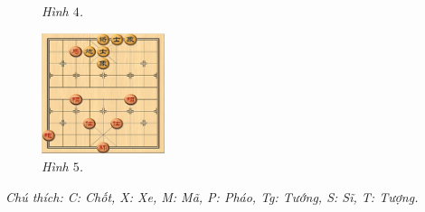 \begin{multicols}{2}
\begin{figure}[H]
					\caption{\small\textit{\color{gocco}Hình $4$.}}
					\vspace*{-10pt}
				\end{figure}
		\begin{figure}[H]
					\vspace*{5pt}
					\centering
					\captionsetup{labelformat= empty, justification=centering}
					\includegraphics[width= 0.32\textwidth]{5}
					\caption{\small\textit{\color{gocco}Hình $5$.}}
					\vspace*{-10pt}
				\end{figure}
		\vskip 0.05cm   
		\textit{Chú thích: C: Chốt, X: Xe, M: Mã, P: Pháo, Tg: Tướng, S: Sĩ, T: Tượng.}
\end{multicols}




